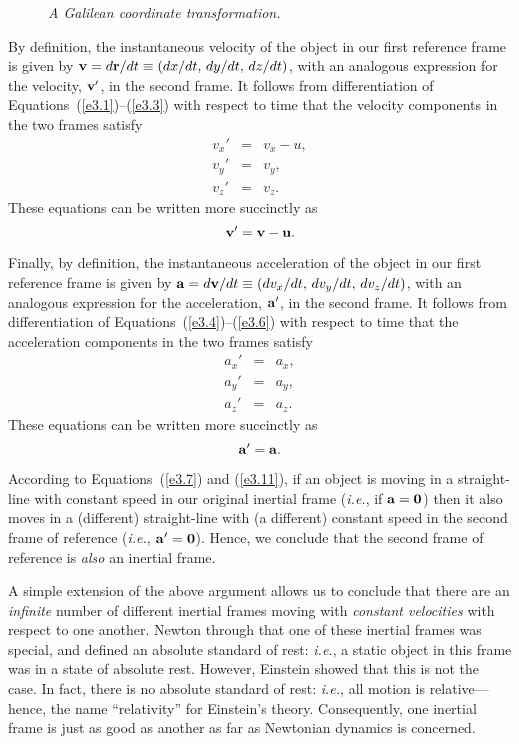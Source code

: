 \begin{figure}
\epsfysize=2.25in
\centerline{}
\caption{\em A Galilean coordinate transformation.}\label{fun1}
\end{figure}

By definition, the instantaneous velocity of the object in our first reference frame is given by
${\bf v} = d{\bf r}/dt \equiv (dx/dt,\,dy/dt,\,dz/dt)$, with an analogous
expression for the velocity, ${\bf v}'$, in the second frame. 
It follows from differentiation of Equations~(\ref{e3.1})--(\ref{e3.3}) with respect to time that the velocity components in the two frames satisfy
\begin{eqnarray}\label{e3.4}
v_x'& = &v_x - u,\\[0.5ex]
v_y' &=& v_y ,\\[0.5ex]
v_z'&=&v_z.\label{e3.6}
\end{eqnarray}
These equations can be written more succinctly as
\begin{equation}\label{e3.7}
{\bf v}' = {\bf v} - {\bf u}.
\end{equation}

Finally, by definition, the instantaneous acceleration of the object in our first reference frame is given by
${\bf a} = d{\bf v}/dt \equiv (dv_x/dt,\,dv_y/dt,\,dv_z/dt)$, with an analogous
expression for the acceleration, ${\bf a}'$, in the second frame. 
It follows from differentiation of Equations~(\ref{e3.4})--(\ref{e3.6}) with respect to time that the acceleration
components in the two frames satisfy
\begin{eqnarray}
a_x'& = &a_x,\\[0.5ex]
a_y' &=& a_y ,\\[0.5ex]
a_z'&=&a_z.
\end{eqnarray}
These equations can be written more succinctly as
\begin{equation}\label{e3.11}
{\bf a}' = {\bf a}.
\end{equation}

According to Equations~(\ref{e3.7}) and (\ref{e3.11}), if an
object is moving  in a straight-line with constant speed in our original
inertial frame ({\em i.e.}, if  ${\bf a}={\bf 0}$) then it also
moves in a (different) straight-line  with (a different) constant speed 
in the second frame of reference ({\em i.e.}, ${\bf a}'= {\bf 0}$). Hence,
we conclude that the second frame of reference is {\em also} an inertial frame.

A simple extension of the above argument allows us to conclude that there
are an {\em infinite}\/ number of different inertial frames moving with {\em constant
velocities}\/ with respect to one another. Newton through that one of these inertial frames was special, and
defined an absolute standard of rest: {\em i.e.}, a static object in this frame was in a state of absolute rest.
However, Einstein showed that this is not the case. In fact, there is no absolute standard of rest: {\em i.e.}, all
motion is relative---hence, the name ``relativity'' for Einstein's theory. Consequently, one inertial frame is
just as good as another as far as Newtonian dynamics is concerned. 

